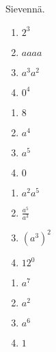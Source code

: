    
	Sievennä.
    \begin{tehtava}%
		\begin{enumerate}
        	\item $2^3 $ 
        	\item $aaaa$ 
        	\item $a^3a^2$ 
        	\item $0^4$
		\end{enumerate}        
        \begin{vastaus}
        \begin{enumerate}
            \item $8$ 
            \item $a^4$ 
            \item $a^5$ 
            \item $0$
        \end{enumerate}
        \end{vastaus}
    \end{tehtava}

    \begin{tehtava}%
        \begin{enumerate}
        	\item $a^2a^5 $ 
        	\item $\frac{a^5}{a^3}$ 
        	\item $(a^3)^2$ 
        	\item $12^0$
		\end{enumerate}        
        \begin{vastaus}
        \begin{enumerate}
            \item $a^7$ 
            \item $a^2$ 
            \item $a^6$ 
            \item $1$
        \end{enumerate}
        \end{vastaus}
    \end{tehtava}    
    
